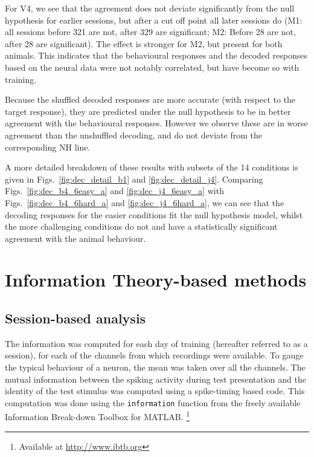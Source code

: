 For \ac{V4}, we see that the agreement does not deviate significantly from the null hypothesis for earlier sessions, but after a cut off point all later sessions do (\ac{M1}: all sessions before 321 are not, after 329 are significant; \ac{M2}: Before 28 are not, after 28 are significant).
The effect is stronger for \ac{M2}, but present for both animals.
This indicates that the behavioural responses and the decoded responses based on the neural data were not notably correlated, but have become so with training.

Because the shuffled decoded responses are more accurate (with respect to the target response), they are predicted under the null hypothesis to be in better agreement with the behavioural responses.
However we observe these are in worse agreement than the unshuffled decoding, and do not deviate from the corresponding NH line.

A more detailed breakdown of these results with subsets of the 14 conditions is given in Figs.~\ref{fig:dec_detail_b1} and \ref{fig:dec_detail_j4}.
Comparing Figs.~\ref{fig:dec_b4_6easy_a} and \ref{fig:dec_j4_6easy_a} with Figs.~\ref{fig:dec_b4_6hard_a} and \ref{fig:dec_j4_6hard_a}, we can see that the decoding responses for the easier conditions fit the null hypothesis model, whilst the more challenging conditions do not and have a statistically significant agreement with the animal behaviour.


\FloatBarrier
\section{Information Theory-based methods}

\subsection{Session-based analysis}

The information was computed for each day of training (hereafter referred to as a session), for each of the channels from which recordings were available.
To gauge the typical behaviour of a neuron, the mean was taken over all the channels.
The mutual information between the spiking activity during test presentation and the identity of the test stimulus was computed
using a spike-timing based code.
This computation was done using the \verb|information| function from the freely available Information Break-down Toolbox \citep{Magri2009} for MATLAB.%
\footnote{Available at \url{http://www.ibtb.org}}

